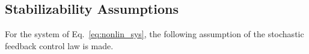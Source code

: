\documentclass[letterpaper, 10pt, conference]{ieeeconf}
\newtheorem{asm}{Assumption}
\begin{document}
	\subsection{Stabilizability Assumptions}
	For the system of Eq.~\ref{eq:nonlin_sys}, the following assumption of the stochastic feedback control law is made.
\end{document}
